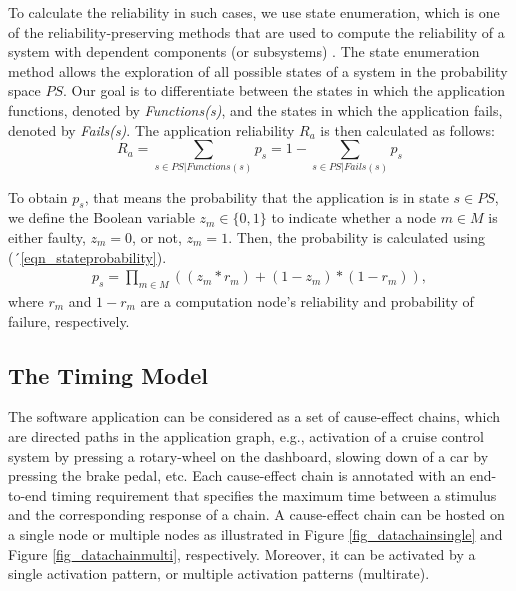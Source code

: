 To calculate the reliability in such cases, we use state enumeration, which is one of the reliability-preserving methods that are used to compute the reliability of a system with dependent components (or subsystems) \cite{Lucet1999ExactReliability}. The state enumeration method allows the exploration of all possible states of a system in the probability space $P\!S$. Our goal is to differentiate between the states in which the application functions, denoted by \textit{Functions(s)}, and the states in which the application fails, denoted by \textit{Fails(s)}. The application reliability $R_a$ is then calculated as follows:
\begin{equation}
\label{eqn_appreliability}
R_a=\sum_{s\in PS|Functions(s)}p_s=1-\sum_{s\in PS|Fails(s)}p_s
\end{equation}

To obtain $p_s$, that means the probability that the application is in state $s\in PS$, we define the Boolean variable $z_m \in \{0,1\}$ to indicate whether a node $m \in M$ is either faulty, $z_m = 0$, or not, $z_m = 1$. Then, the probability is calculated using (´\ref{eqn_stateprobability}).
\begin{align}
\label{eqn_stateprobability}
p_s=\prod_{m\in M}((z_m*r_m) + (1-z_m)*(1-r_m)),
\end{align}
where $r_m$ and $1-r_m$ are a computation node's reliability and probability of failure, respectively.

\subsection{The Timing Model}
The software application can be considered as a set of cause-effect chains, which are directed paths in the application graph, e.g.,  activation of a cruise control system by pressing a rotary-wheel on the dashboard, slowing down of a car by pressing the brake pedal, etc. Each cause-effect chain is annotated with an end-to-end timing requirement that specifies the maximum time between a stimulus and the corresponding response of a chain. A cause-effect chain can be hosted on a single node or multiple nodes as illustrated in Figure \ref{fig_datachainsingle} and Figure \ref{fig_datachainmulti}, respectively. Moreover, it can be activated by a single activation pattern, or multiple activation patterns (multirate).

